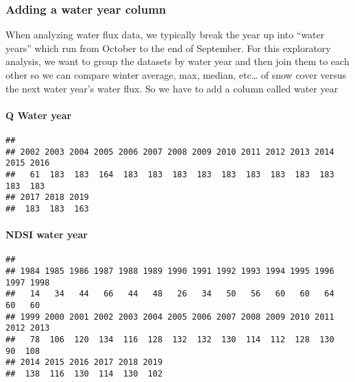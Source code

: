 \documentclass[]{article}
\newenvironment{Shaded}{\begin{snugshade}}{\end{snugshade}}
\newcommand{\DataTypeTok}[1]{\textcolor[rgb]{0.13,0.29,0.53}{#1}}
\newcommand{\DecValTok}[1]{\textcolor[rgb]{0.00,0.00,0.81}{#1}}
\newcommand{\KeywordTok}[1]{\textcolor[rgb]{0.13,0.29,0.53}{\textbf{#1}}}
\newcommand{\NormalTok}[1]{#1}
\newcommand{\OperatorTok}[1]{\textcolor[rgb]{0.81,0.36,0.00}{\textbf{#1}}}
\newcommand{\StringTok}[1]{\textcolor[rgb]{0.31,0.60,0.02}{#1}}
\let\oldparagraph\paragraph
\renewcommand{\paragraph}[1]{\oldparagraph{#1}\mbox{}}
\begin{document}
\hypertarget{adding-a-water-year-column}{%
\subsubsection{Adding a water year
column}\label{adding-a-water-year-column}}

When analyzing water flux data, we typically break the year up into
``water years'' which run from October to the end of September. For this
exploratory analysis, we want to group the datasets by water year and
then join them to each other so we can compare winter average, max,
median, etc\ldots{} of snow cover versus the next water year's water
flux. So we have to add a column called water year

\hypertarget{q-water-year}{%
\paragraph{Q Water year}\label{q-water-year}}

\begin{Shaded}
\end{Shaded}

\begin{verbatim}
## 
## 2002 2003 2004 2005 2006 2007 2008 2009 2010 2011 2012 2013 2014 2015 2016 
##   61  183  183  164  183  183  183  183  183  183  183  183  183  183  183 
## 2017 2018 2019 
##  183  183  163
\end{verbatim}

\hypertarget{ndsi-water-year}{%
\paragraph{NDSI water year}\label{ndsi-water-year}}

\begin{verbatim}
## 
## 1984 1985 1986 1987 1988 1989 1990 1991 1992 1993 1994 1995 1996 1997 1998 
##   14   34   44   66   44   48   26   34   50   56   60   60   64   60   60 
## 1999 2000 2001 2002 2003 2004 2005 2006 2007 2008 2009 2010 2011 2012 2013 
##   78  106  120  134  116  128  132  132  130  114  112  128  130   90  108 
## 2014 2015 2016 2017 2018 2019 
##  138  116  130  114  130  102
\end{verbatim}
\end{document}
